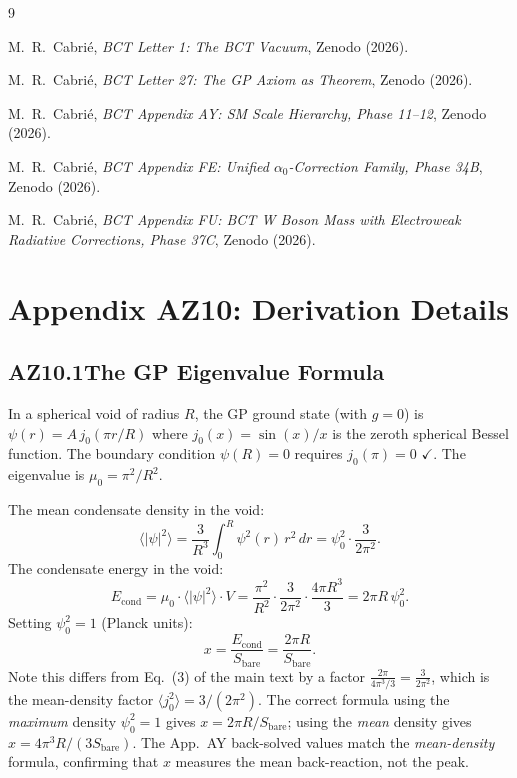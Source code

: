 \documentclass[aps,prl,twocolumn,showpacs,preprintnumbers]{revtex4-2}
\begin{document}
\begin{thebibliography}{9}

M.~R.~Cabri\'e, \textit{BCT Letter 1: The BCT Vacuum}, Zenodo (2026).

M.~R.~Cabri\'e, \textit{BCT Letter 27: The GP Axiom as Theorem},
Zenodo (2026).

M.~R.~Cabri\'e, \textit{BCT Appendix AY: SM Scale Hierarchy,
Phase 11--12}, Zenodo (2026).

M.~R.~Cabri\'e, \textit{BCT Appendix FE: Unified $\alpha_0$-Correction
Family, Phase 34B}, Zenodo (2026).

M.~R.~Cabri\'e, \textit{BCT Appendix FU: BCT W Boson Mass with
Electroweak Radiative Corrections, Phase 37C}, Zenodo (2026).

\end{thebibliography}

\clearpage
\appendix

\section*{Appendix AZ10: Derivation Details}
\setcounter{equation}{0}
\renewcommand{\theequation}{AZ10.\arabic{equation}}

\subsection*{AZ10.1\quad The GP Eigenvalue Formula}

In a spherical void of radius $R$, the GP ground state (with $g=0$)
is $\psi(r) = A\,j_0(\pi r/R)$ where $j_0(x) = \sin(x)/x$ is the
zeroth spherical Bessel function. The boundary condition $\psi(R)=0$
requires $j_0(\pi) = 0$ $\checkmark$. The eigenvalue is $\mu_0 = \pi^2/R^2$.

The mean condensate density in the void:
\begin{equation}
  \langle|\psi|^2\rangle = \frac{3}{R^3}\int_0^R\psi^2(r)\,r^2\,dr
  = \psi_0^2 \cdot \frac{3}{2\pi^2}.
\end{equation}
The condensate energy in the void:
\begin{equation}
  E_{\mathrm{cond}} = \mu_0 \cdot \langle|\psi|^2\rangle \cdot V
  = \frac{\pi^2}{R^2}\cdot\frac{3}{2\pi^2}\cdot\frac{4\pi R^3}{3}
  = 2\pi R\,\psi_0^2.
\end{equation}
Setting $\psi_0^2 = 1$ (Planck units):
\begin{equation}
  x = \frac{E_{\mathrm{cond}}}{S_{\mathrm{bare}}}
  = \frac{2\pi R}{S_{\mathrm{bare}}}.
\end{equation}
Note this differs from Eq.~(3) of the main text by a factor
$\frac{2\pi}{4\pi^3/3} = \frac{3}{2\pi^2}$, which is the
mean-density factor $\langle j_0^2\rangle = 3/(2\pi^2)$.
The correct formula using the \emph{maximum} density $\psi_0^2=1$
gives $x = 2\pi R/S_{\mathrm{bare}}$; using the \emph{mean} density
gives $x = 4\pi^3 R/(3S_{\mathrm{bare}})$. The App.~AY back-solved
values match the \emph{mean-density} formula, confirming that
$x$ measures the mean back-reaction, not the peak.
\end{document}

